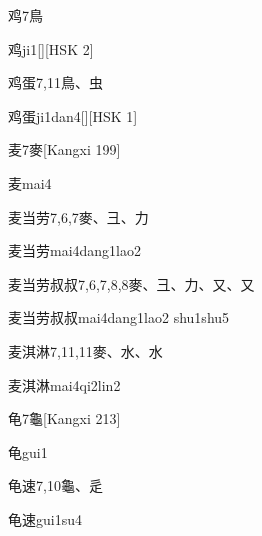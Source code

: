 \begin{Entry}{鸡}{7}{⿃}
  \begin{Phonetics}{鸡}{ji1}[][HSK 2]
  \end{Phonetics}
\end{Entry}

\begin{Entry}{鸡蛋}{7,11}{⿃、⾍}
  \begin{Phonetics}{鸡蛋}{ji1dan4}[][HSK 1]
  \end{Phonetics}
\end{Entry}

\begin{Entry}{麦}{7}{⿆}[Kangxi 199]
  \begin{Phonetics}{麦}{mai4}
  \end{Phonetics}
\end{Entry}

\begin{Entry}{麦当劳}{7,6,7}{⿆、⼹、⼒}
  \begin{Phonetics}{麦当劳}{mai4dang1lao2}
  \end{Phonetics}
\end{Entry}

\begin{Entry}{麦当劳叔叔}{7,6,7,8,8}{⿆、⼹、⼒、⼜、⼜}
  \begin{Phonetics}{麦当劳叔叔}{mai4dang1lao2 shu1shu5}
  \end{Phonetics}
\end{Entry}

\begin{Entry}{麦淇淋}{7,11,11}{⿆、⽔、⽔}
  \begin{Phonetics}{麦淇淋}{mai4qi2lin2}
  \end{Phonetics}
\end{Entry}

\begin{Entry}{龟}{7}{⿔}[Kangxi 213]
  \begin{Phonetics}{龟}{gui1}
  \end{Phonetics}
\end{Entry}

\begin{Entry}{龟速}{7,10}{⿔、⾡}
  \begin{Phonetics}{龟速}{gui1su4}
  \end{Phonetics}
\end{Entry}


